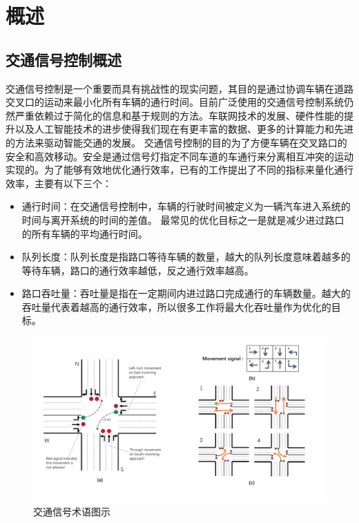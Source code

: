 
\chapter{概述}
\section{交通信号控制概述}
交通信号控制是一个重要而具有挑战性的现实问题，其目的是通过协调车辆在道路交叉口的运动来最小化所有车辆的通行时间。目前广泛使用的交通信号控制系统仍然严重依赖过于简化的信息和基于规则的方法。车联网技术的发展、硬件性能的提升以及人工智能技术的进步使得我们现在有更丰富的数据、更多的计算能力和先进的方法来驱动智能交通的发展。 
交通信号控制的目的为了方便车辆在交叉路口的安全和高效移动。安全是通过信号灯指定不同车道的车通行来分离相互冲突的运动实现的。为了能够有效地优化通行效率，已有的工作提出了不同的指标来量化通行效率，主要有以下三个：
\begin{itemize}
    \item 通行时间：在交通信号控制中，车辆的行驶时间被定义为一辆汽车进入系统的时间与离开系统的时间的差值。 最常见的优化目标之一是就是减少进过路口的所有车辆的平均通行时间。
    \item 队列长度：队列长度是指路口等待车辆的数量，越大的队列长度意味着越多的等待车辆，路口的通行效率越低，反之通行效率越高。
    \item 路口吞吐量：吞吐量是指在一定期间内进过路口完成通行的车辆数量。越大的吞吐量代表着越高的通行效率，所以很多工作将最大化吞吐量作为优化的目标。
\end{itemize}

\begin{figure}[htb]
    \includegraphics[width=.9\textwidth]{fig/tsc.pdf}
    \caption{交通信号术语图示}
    \label{fig:tsc}
\end{figure}
